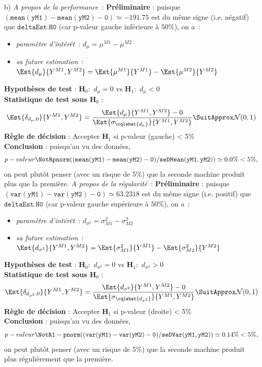 \documentclass[10pt]{report}
\begin{document}
\begin{exercice}
\begin{Correction}
\noindent b) \textit{A propos de la performance}~:
\noindent \textbf{Préliminaire} : puisque $\mathtt{(mean(yM1)-mean(yM2)-0)}\simeq-191.75$ est du même signe (i.e. négatif) que $\mathtt{deltaEst.H0}$ (car p-valeur gauche inférieure à $50\%$), on a~: 
      \begin{itemize}
\item \textit{paramètre d'intérêt}~: $d_\mu=\mu^{M1}-\mu^{M2}$
\item \textit{sa future estimation}~: $\Est{d_\mu}{Y^{M1},Y^{M2}}=\Est{\mu^{M1}}{Y^{M1}}-\Est{\mu^{M2}}{Y^{M2}}$
\end{itemize}
\noindent \textbf{Hypothèses de test} : $\mathbf{H}_0:$ $d_\mu=0$ vs {\large $\mathbf{H}_1:$ $d_\mu<0$}\\
\textbf{Statistique de test sous $\mathbf{H}_0$} :
  $$
  \Est{\delta_{d_\mu,0}}{Y^{M1},Y^{M2}}= {\displaystyle \frac{\Est{d_\mu}{Y^{M1},Y^{M2}}-0}{
\Est{\sigma_{\cqlshat{d_\mu}}}{Y^{M1},Y^{M2}}
}} 
  \SuitApprox \mathcal{N}(0,1)
  $$
\textbf{Règle de décision} : Accepter $\mathbf{H}_1$ si 
  p-valeur (gauche) < 5\%\\
\noindent \textbf{Conclusion} :
puisqu'au vu des données, 
  \[
p-valeur\NotR\mathtt{pnorm((mean(yM1)-mean(yM2)-0)/seDMean(yM1,yM2))} \simeq 0.0\% < 5\%,
\]
on peut plutôt penser (avec un risque de 5\%) que la seconde machine produit plus que la première.
\noindent \textit{A propos de la régularité}~:
\noindent \textbf{Préliminaire} : puisque $\mathtt{(var(yM1)-var(yM2)-0)}\simeq63.2318$ est du même signe (i.e. positif) que $\mathtt{deltaEst.H0}$ (car p-valeur gauche supérieure à $50\%$), on a~: 
      \begin{itemize}
\item \textit{paramètre d'intérêt}~: $d_{\sigma^2}=\sigma^2_{M1}-\sigma^2_{M2}$
\item \textit{sa future estimation}~: $\Est{d_{\sigma^2}}{Y^{M1},Y^{M2}}=\Est{\sigma^2_{M1}}{Y^{M1}}-\Est{\sigma^2_{M2}}{Y^{M2}}$
\end{itemize}
\noindent \textbf{Hypothèses de test} : $\mathbf{H}_0:$ $d_{\sigma^2}=0$ vs {\large $\mathbf{H}_1:$ $d_{\sigma^2}>0$}\\
\textbf{Statistique de test sous $\mathbf{H}_0$} :
  $$
  \Est{\delta_{d_{\sigma^2},0}}{Y^{M1},Y^{M2}}= {\displaystyle \frac{\Est{d_{\sigma^2}}{Y^{M1},Y^{M2}}-0}{
\Est{\sigma_{\cqlshat{d_{\sigma^2}}}}{Y^{M1},Y^{M2}}
}} 
  \SuitApprox \mathcal{N}(0,1)
  $$
\textbf{Règle de décision} : Accepter $\mathbf{H}_1$ si 
  p-valeur (droite) < 5\%\\
\noindent \textbf{Conclusion} :
puisqu'au vu des données, 
  \[
p-valeur\NotR\mathtt{1-pnorm((var(yM1)-var(yM2)-0)/seDVar(yM1,yM2))} \simeq 0.14\% < 5\%,
\]
on peut plutôt penser (avec un risque de 5\%) que la seconde machine produit plus r{\'e}guli{\`e}rement que la première.
\end{Correction}


\end{exercice}
\end{document}
